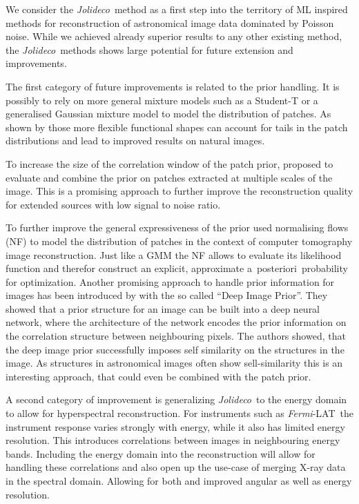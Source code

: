 \documentclass[twocolumn]{aastex631}
\newcommand{\fermi}{\textit{Fermi}-LAT~}
\newcommand{\jolideco}{\textit{Jolideco}~}
\newcommand{\aposteriori}{a~posteriori~}
\newcommand{\xray}{X-ray\xspace}
\begin{document}
    We consider the \jolideco method as a first step into the territory of ML inspired methods for reconstruction of astronomical image data dominated by Poisson noise. While we achieved already superior results to any other existing method, the \jolideco methods shows large potential for future extension and improvements.
    
    The first category of future improvements is related to the prior handling. It is possibly to rely on more general mixture models such as a Student-T or a generalised Gaussian mixture model to model the distribution of patches. As shown by \cite{VanDenOord2014} those more flexible functional shapes can account for tails in the patch distributions and lead to improved results on natural images.
    
    To increase the size of the correlation window of the patch prior, \cite{Papyan2015} proposed to evaluate and combine the prior on patches extracted at multiple scales of the image. This is a promising approach to further improve the reconstruction quality for extended sources with low signal to noise ratio.
    
    To further improve the general expressiveness of the prior \cite{Altekrueger2022} used normalising flows (NF) to model the distribution of patches in the context of computer tomography image reconstruction. Just like a GMM the NF allows to evaluate its likelihood function and therefor construct an explicit, approximate \aposteriori probability for optimization. 
    Another promising approach to handle prior information for images has been introduced by \citep{Ulyanov2017} with the so called \enquote{Deep Image Prior}. They showed that a prior structure for an image can be built into a deep neural network, where the architecture of the network encodes the prior information on the correlation structure between neighbouring pixels. The authors showed, that the deep image prior successfully imposes self similarity on the structures in the image. As structures in astronomical images often show sell-similarity this is an interesting approach, that could even be combined with the patch prior.

    A second category of improvement is generalizing \jolideco to the energy domain to allow for hyperspectral reconstruction. For instruments such as \fermi the instrument response varies strongly with energy, while it also has limited energy resolution. This introduces correlations between images in neighbouring energy bands. Including the energy domain into the reconstruction will allow for handling these correlations and also open up the use-case of merging \xray data in the spectral domain. Allowing for both  and improved angular as well as energy resolution. 
\end{document}
